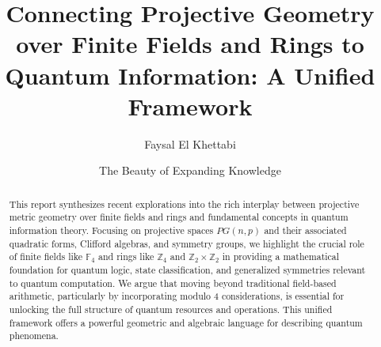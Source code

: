 \documentclass{article}
\title{Connecting Projective Geometry over Finite Fields and Rings to Quantum Information: A Unified Framework}
\author[1]{Faysal El Khettabi}
\affil[1]{\texttt{faysal.el.khettabi@gmail.com} \\ LinkedIn: \href{https://www.linkedin.com/in/faysal-el-khettabi-ph-d-4847415}{faysal-el-khettabi-ph-d-4847415}}
\date{The Beauty of Expanding Knowledge} %
\begin{document}
\maketitle

\begin{abstract}
This report synthesizes recent explorations into the rich interplay between projective metric geometry over finite fields and rings and fundamental concepts in quantum information theory. Focusing on projective spaces $PG(n,p)$ and their associated quadratic forms, Clifford algebras, and symmetry groups, we highlight the crucial role of finite fields like $\mathbb{F}_4$ and rings like $\mathbb{Z}_4$ and $\mathbb{Z}_2 \times \mathbb{Z}_2$ in providing a mathematical foundation for quantum logic, state classification, and generalized symmetries relevant to quantum computation. We argue that moving beyond traditional field-based arithmetic, particularly by incorporating modulo 4 considerations, is essential for unlocking the full structure of quantum resources and operations. This unified framework offers a powerful geometric and algebraic language for describing quantum phenomena.
\end{abstract}
\end{document}
